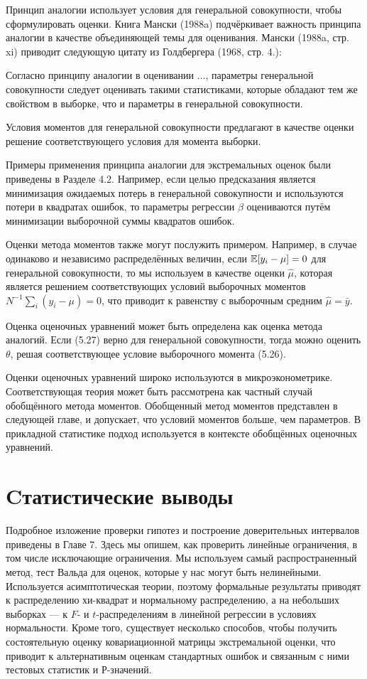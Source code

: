 Принцип аналогии использует условия для генеральной совокупности, чтобы сформулировать оценки. Книга Мански (1988a) подчёркивает важность принципа аналогии в качестве объединяющей темы для оценивания. Мански (1988a, стр. xi) приводит следующую цитату из Голдбергера (1968, стр. 4.):

Согласно принципу аналогии в оценивании $\dots$, параметры генеральной совокупности следует оценивать такими статистиками, которые обладают тем же свойством в выборке, что и параметры в генеральной совокупности.

Условия моментов для генеральной совокупности предлагают в качестве оценки решение соответствующего условия для момента выборки.

Примеры применения принципа аналогии для экстремальных оценок были приведены в Разделе 4.2. Например, если целью предсказания является минимизация ожидаемых потерь в генеральной совокупности и используются потери в квадратах ошибок, то параметры регрессии $\beta$ оцениваются путём минимизации выборочной суммы квадратов ошибок.

Оценки метода моментов также могут послужить примером. Например, в случае одинаково и независимо распределённых величин, если $\mathbb{E}[y_i-\mu]=0$ для генеральной совокупности, то мы используем в качестве оценки $\hat{\mu}$, которая является решением соответствующих условий выборочных моментов $N^{-1} \sum_i (y_i-\mu)=0$, что приводит к равенству с выборочным средним $\hat{\mu}=\bar{y}$.


Оценка оценочных уравнений может быть определена как оценка метода аналогий. Если (5.27) верно для генеральной совокупности, тогда можно оценить $\theta$, решая соответствующее условие выборочного момента (5.26).

Оценки оценочных уравнений широко используются в микроэконометрике. Соответствующая теория может быть рассмотрена как частный случай обобщённого метода моментов. Обобщенный метод моментов представлен в следующей главе, и допускает, что условий моментов больше, чем параметров. В прикладной статистике подход используется в контексте обобщённых оценочных уравнений.

\section{Cтатистические выводы} 

Подробное изложение проверки гипотез и построение доверительных интервалов приведены в Главе 7. Здесь мы опишем, как проверить линейные ограничения, в том числе исключающие ограничения. Мы используем самый распространенный метод, тест Вальда для оценок, которые у нас могут быть нелинейными.  Используется асимптотическая теории, поэтому формальные результаты приводят к распределению хи-квадрат и нормальному распределению, а на небольших выборках --- к $F$- и $t$-распределениям в линейной регрессии в условиях нормальности. Кроме того, существует несколько способов, чтобы получить состоятельную оценку ковариационной матрицы экстремальной оценки, что приводит к альтернативным оценкам стандартных ошибок и связанным с ними тестовых статистик и Р-значений.

